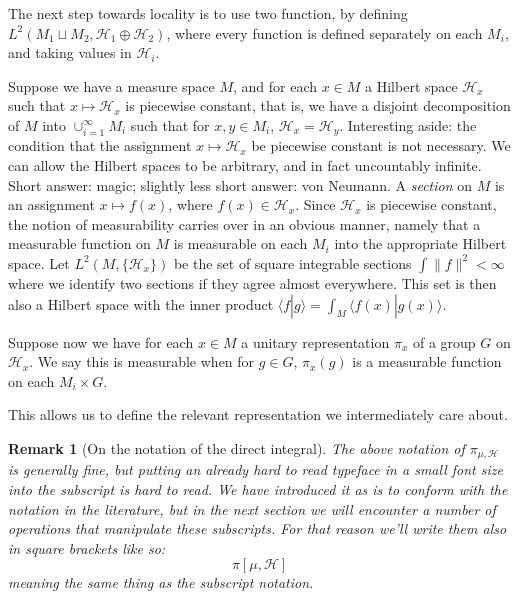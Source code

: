 \documentclass[
  12pt
]{article}
\theoremstyle{break}
\theoremstyle{plain}
\newtheorem*{rk}{Remark}
\newcommand{\hilb}{\ensuremath{\mathscr{H}}\xspace}
\begin{document}

  The next step towards locality is to use two function, by defining
  $L^2(M_1 \sqcup M_2, \mathscr{H}_1 \oplus \mathscr{H}_2)$, where every
  function is defined separately on each $M_i$, and taking values in
  $\mathscr{H}_i$.



  Suppose we have a measure space $M$, and for each $x \in M$ a
  Hilbert space $\mathscr{H}_x$ such that $x \mapsto \mathscr{H}_x$ is
  piecewise constant, that is, we have a disjoint decomposition of $M$
  into $\cup_{i=1}^{\infty} M_i$ such that for $x,y \in M_i$,
  $\mathscr{H}_x = \mathscr{H}_y$. 
  Interesting aside: the condition that the assignment
  $x \mapsto \mathscr{H}_x$ be piecewise constant is not necessary. We
  can allow the Hilbert spaces to be arbitrary, and in fact uncountably
  infinite. Short answer: magic; slightly less short answer: von Neumann.
  A \emph{section} on $M$ is an assignment $x \mapsto f(x)$, where
  $f(x) \in \mathscr{H}_x$. Since $\mathscr{H}_x$ is piecewise
  constant, the notion of measurability carries over in an obvious manner,
  namely that a measurable function on $M$ is measurable on each $M_i$
  into the appropriate Hilbert space. Let $L^2(M, \{\mathscr{H}_x\})$ be
  the set of square integrable sections $\int \| f \|^2 < \infty$ where
  we identify two sections if they agree almost everywhere. This set is
  then also a Hilbert space with the inner product
  $\langle f | g \rangle = \int_M \langle f(x) | g(x) \rangle$.

  Suppose now we have for each $x \in M$ a unitary representation
  $\pi_x$ of a group $G$ on $\mathscr{H}_x$. We say this is
  measurable when for $g \in G$, $\pi_x(g)$ is a measurable function
  on each $M_i \times G$.

  This allows us to define the relevant representation we intermediately
  care about.

  \begin{rk}[On the notation of the direct integral]
    \label{rem:integral-notation}
    The above notation of $\pi_{\mu, \hilb}$ is generally fine, but putting an
    already hard to read typeface in a small font size into the subscript is
    hard to read. We have introduced it as is to conform with the notation in
    the literature, but in the next section we will encounter a number of
    operations that manipulate these subscripts. For that reason we'll write
    them also in square brackets like so:
    $$
    \pi[\mu, \hilb]
    $$
    meaning the same thing as the subscript notation.
  \end{rk}
\end{document}
